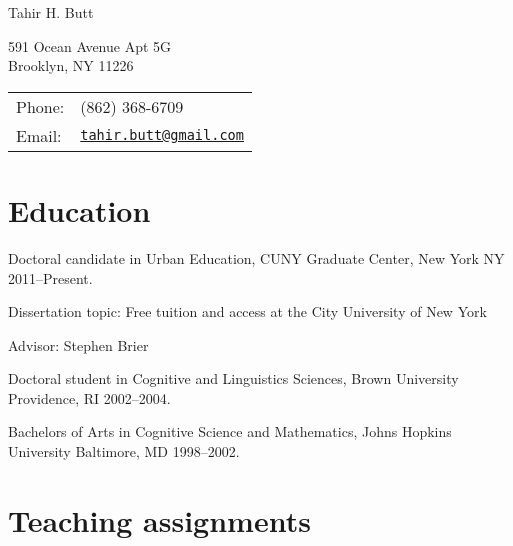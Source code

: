 \documentclass[letterpaper]{article}
\def\name{Tahir H. Butt}
\renewenvironment{itemize}{
  \begin{list}{}{
    \setlength{\leftmargin}{1.5em}
  }
}{
  \end{list}
}
\begin{document}
{\huge \name}


\vspace{0.25in}

\begin{minipage}{0.45\linewidth}
  591 Ocean Avenue Apt 5G \\
  Brooklyn, NY 11226
  \end{minipage}
\begin{minipage}{0.45\linewidth}
  \begin{tabular}{ll}
    Phone: & (862) 368-6709 \\
    Email: & \href{mailto:tahir.butt@gmail.com}{\tt tahir.butt@gmail.com} \\
  \end{tabular}
\end{minipage}


\section*{Education}

\begin{itemize}
    \item Doctoral candidate in Urban Education, CUNY Graduate Center, New York NY 2011--Present.
    \begin{itemize}
        \item Dissertation topic: Free tuition and access at the City University of New York
        \item Advisor: Stephen Brier
    \end{itemize}
    \item Doctoral student in Cognitive and Linguistics Sciences, Brown University Providence, RI 2002--2004.
    \item Bachelors of Arts in Cognitive Science and Mathematics, Johns Hopkins University Baltimore, MD 1998--2002.
\end{itemize}

\section*{Teaching assignments}
\end{document}
